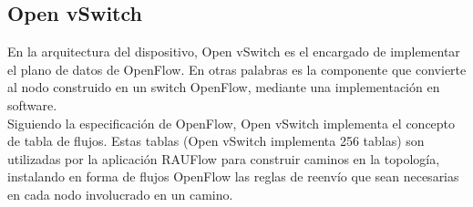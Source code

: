 



\subsection{Open vSwitch}
En la arquitectura del dispositivo, Open vSwitch es el encargado de implementar el plano de datos de OpenFlow. En otras palabras es la componente que convierte al nodo construido en un switch OpenFlow, mediante una implementaci\'on en software.\\

Siguiendo la especificaci\'on de OpenFlow, Open vSwitch implementa el concepto de tabla de flujos. Estas tablas (Open vSwitch implementa 256 tablas) son utilizadas por la aplicaci\'on RAUFlow para construir caminos en la topolog\'ia, instalando en forma de flujos OpenFlow las reglas de reenvío que sean necesarias en cada nodo involucrado en un camino.

